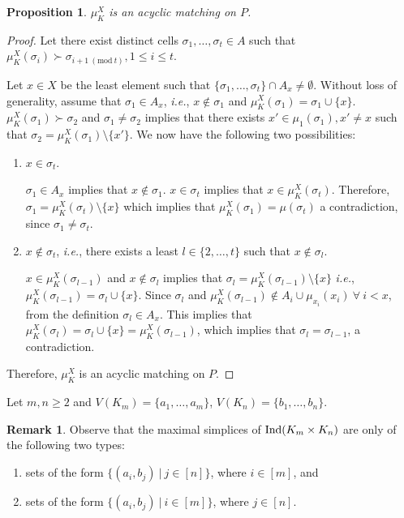 \documentclass[12pt]{article}
\numberwithin{thm}{section}
\newtheorem{prop}[thm]{Proposition}
\theoremstyle{definition}
\newtheorem{rmk}{Remark}
\newcommand{\ind}{{\rm{Ind}}}
\begin{document}
   
  \begin{prop}\label{prop:acyclic}
  	$\mu_K^{X}$ is an acyclic matching on $P$.
  \end{prop}
  \begin{proof}
  	Let there exist distinct cells $\sigma_1, \ldots, \sigma_t \in A$ such that $\mu_K^{X}(\sigma_i) \succ 
  	\sigma_{i+1 \ (\text{mod} \ t)}, 1 \leq i \leq t$.
  	
  	Let $x \in X$ be the least element such that $\{\sigma_1, \ldots, \sigma_t\} \cap A_x \neq \emptyset$.
  	Without loss of generality, assume that $\sigma_1 \in A_x$, {\it i.e.}, $x \notin \sigma_1$ and $\mu_K^X(\sigma_1) = \sigma_{1} \cup \{x\}$. $\mu_K^X(\sigma_1) \succ \sigma_2$ and  $\sigma_1 \neq \sigma_2$ implies that there exists $x' \in \mu_1(\sigma_1), x' \neq x$ such that 
  	$\sigma_2 = \mu_K^{X}(\sigma_1) \setminus \{x'\}$. We now have the following two possibilities:
  	\begin{enumerate}
  		\item $x \in \sigma_{t}$. 
  		
  		$\sigma_1 \in A_x$ implies that $x \notin \sigma_1$.  $x \in \sigma_t$ implies that $x \in \mu_K^X(\sigma_t)$. Therefore, $\sigma_1 = \mu_K^X(\sigma_t) \setminus \{x\}$ which implies that $\mu_K^X(\sigma_1) = \mu(\sigma_t)$ a contradiction, since $\sigma_1 \neq \sigma_t$.
  		
  		\item $x \notin \sigma_{t}$,  {\it i.e.}, there exists  a least $l \in \{2, \ldots, t\}$ such that $x \notin \sigma_l$.
  		
  		$x \in \mu_K^X(\sigma_{l-1})$ and $x \notin \sigma_l$ implies that $\sigma_l = \mu_K^X(\sigma_{l-1}) \setminus \{x\}$ {\it i.e.}, $\mu_K^X(\sigma_{l-1}) = \sigma_l \cup \{x\}$. Since $\sigma_l$ and $\mu_K^X(\sigma_{l-1}) \notin A_i \cup \mu_{x_i}(x_i) \ \forall \ i < x$, from the definition $\sigma_l \in A_x$. This implies that $\mu_K^X(\sigma_l) = \sigma_l \cup \{x\} = \mu_K^X(\sigma_{l-1})$, which implies that $\sigma_l = \sigma_{l-1}$, a contradiction.
  	\end{enumerate}
  	Therefore,  $\mu_K^{X}$ is an acyclic matching on $P$.
  \end{proof}
 
  Let $m,n \geq 2$ and $V(K_m)=\{a_1,\ldots,a_m\}$, $V(K_n)= \{b_1,\ldots,b_n\}$. 
  
  \begin{rmk}\label{rmk:maximalsets}
  Observe that the maximal simplices  of $\ind(K_m\times K_n)$ are only of  the following two types:
 
  \begin{enumerate}
 \item  sets of the form $\{(a_i,b_j) \ | \ j \in [n]\}$, where $i \in [m]$, and
 \item  sets of the form $\{(a_i,b_j) \ | \ i \in [m]\}$, where $j \in [n]$.
 \end{enumerate}
 \end{rmk}
 
\end{document}
